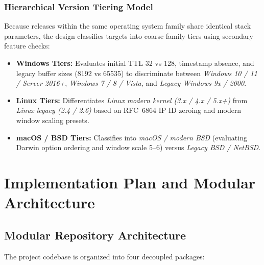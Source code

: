 \documentclass[11pt,a4paper]{article}
\begin{document}
\subsubsection{Hierarchical Version Tiering Model}
Because releases within the same operating system family share identical stack parameters, the design classifies targets into coarse family tiers using secondary feature checks:
\begin{itemize}[nosep, leftmargin=1.4em]
    \item \textbf{Windows Tiers:} Evaluates initial TTL 32 vs 128, timestamp absence, and legacy buffer sizes (8192 vs 65535) to discriminate between \textit{Windows 10 / 11 / Server 2016+}, \textit{Windows 7 / 8 / Vista}, and \textit{Legacy Windows 9x / 2000}.
    \item \textbf{Linux Tiers:} Differentiates \textit{Linux modern kernel (3.x / 4.x / 5.x+)} from \textit{Linux legacy (2.4 / 2.6)} based on RFC~6864 IP ID zeroing and modern window scaling presets.
    \item \textbf{macOS / BSD Tiers:} Classifies into \textit{macOS / modern BSD} (evaluating Darwin option ordering and window scale 5--6) versus \textit{Legacy BSD / NetBSD}.
\end{itemize}

\section{Implementation Plan and Modular Architecture}

\subsection{Modular Repository Architecture}
The project codebase is organized into four decoupled packages:
\end{document}
